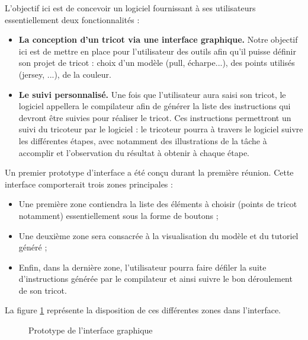 \documentclass{article}
\begin{document}
L'objectif ici est de concevoir un logiciel fournissant à ses utilisateurs essentiellement deux fonctionnalités :
\begin{itemize}
  \item \textbf{La conception d'un tricot via une interface graphique.} Notre objectif ici est de mettre en place pour l'utilisateur des
  outils afin qu'il puisse définir son projet de tricot : choix d'un modèle (pull, écharpe...), des points utilisés
  (jersey, ...), de la couleur.
  \item \textbf{Le suivi personnalisé.} Une fois que l'utilisateur aura saisi son tricot, le logiciel appellera le compilateur afin de générer
la liste des instructions qui devront être suivies pour réaliser le tricot. Ces instructions permettront un suivi du tricoteur par le
logiciel : le tricoteur pourra à travers le logiciel suivre les différentes étapes, avec notamment des illustrations de la tâche à
accomplir et l'observation du résultat à obtenir à chaque étape. \newline
\end{itemize} 

Un premier prototype d'interface a été conçu durant la première réunion. Cette interface comporterait trois zones principales :
\begin{itemize}
  \item Une première zone contiendra la liste des éléments à choisir (points de tricot notamment) essentiellement sous la forme de 
boutons ;
  \item Une deuxième zone sera consacrée à la visualisation du modèle et du tutoriel généré ;
  \item Enfin, dans la dernière zone, l'utilisateur pourra faire défiler la suite d'instructions générée par le compilateur et ainsi 
suivre le bon déroulement de son tricot.
\end{itemize}

La figure \ref{interface} représente la disposition de ces différentes zones dans l'interface.

\begin{figure}[!h] %
  \centering
  \caption{Prototype de l'interface graphique}
  \label{interface}
  \end{figure}
\end{document}
